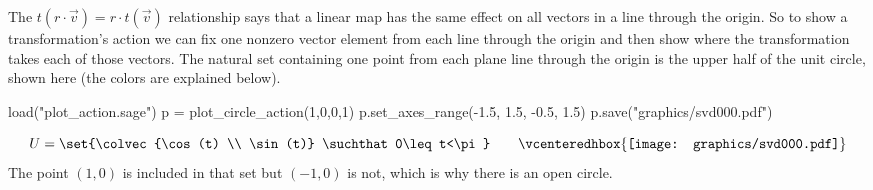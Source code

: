 The $t(r\cdot\vec{v})=r\cdot t(\vec{v})$ relationship says that
a linear map has the same effect on all vectors in a line through the
origin.
So to show a transformation's action we can fix 
one nonzero vector element from each line through the origin
and then show where the transformation takes each of 
those vectors.
The natural set containing one point from each plane line through the origin 
is the upper half of the unit circle, shown here
(the colors are explained below).
\begin{sagesilent}
load("plot_action.sage")
p = plot_circle_action(1,0,0,1) 
p.set_axes_range(-1.5, 1.5, -0.5, 1.5) 
p.save("graphics/svd000.pdf")
\end{sagesilent}
\begin{equation*}
  U=\set{\colvec{\cos(t) \\ \sin(t)}
         \suchthat 
         0\leq t<\pi}
  \qquad
  \vcenteredhbox{\texttt{[image: graphics/svd000.pdf]}}  
\end{equation*}
The point $(1,0)$ is included in that set but
$(-1,0)$ is not, which is why there is an open circle.

